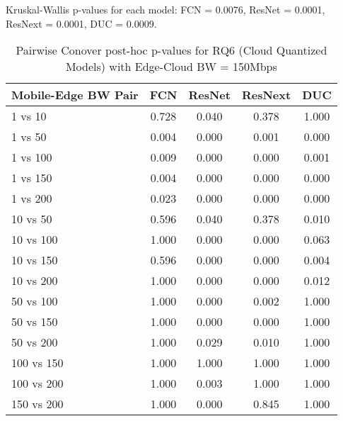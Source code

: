 \begin{table}[h]
\centering
\caption{Pairwise Conover post-hoc p-values for RQ6 (Cloud Quantized Models) with Edge-Cloud BW = 150Mbps}
\label{tab:conover_cloud_quantized_ec150}
\smallskip
Kruskal-Wallis p-values for each model: FCN = 0.0076, ResNet = 0.0001, ResNext = 0.0001, DUC = 0.0009.

\begin{tabular}{lcccc}
\toprule
Mobile-Edge BW Pair & FCN & ResNet & ResNext & DUC \\
\midrule
1 vs 10 & 0.728 & 0.040 & 0.378 & 1.000 \\
1 vs 50 & 0.004 & 0.000 & 0.001 & 0.000 \\
1 vs 100 & 0.009 & 0.000 & 0.000 & 0.001 \\
1 vs 150 & 0.004 & 0.000 & 0.000 & 0.000 \\
1 vs 200 & 0.023 & 0.000 & 0.000 & 0.000 \\
10 vs 50 & 0.596 & 0.040 & 0.378 & 0.010 \\
10 vs 100 & 1.000 & 0.000 & 0.000 & 0.063 \\
10 vs 150 & 0.596 & 0.000 & 0.000 & 0.004 \\
10 vs 200 & 1.000 & 0.000 & 0.000 & 0.012 \\
50 vs 100 & 1.000 & 0.000 & 0.002 & 1.000 \\
50 vs 150 & 1.000 & 0.000 & 0.000 & 1.000 \\
50 vs 200 & 1.000 & 0.029 & 0.010 & 1.000 \\
100 vs 150 & 1.000 & 1.000 & 1.000 & 1.000 \\
100 vs 200 & 1.000 & 0.003 & 1.000 & 1.000 \\
150 vs 200 & 1.000 & 0.000 & 0.845 & 1.000 \\
\bottomrule
\end{tabular}
\end{table}

